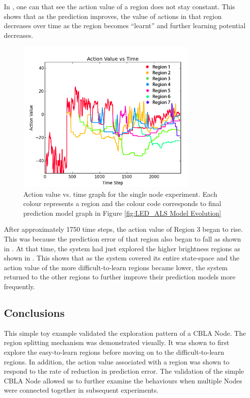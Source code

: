 In , one can that see the action value of a region does not stay constant. This shows that as the prediction improves, the value of actions in that region decreases over time as the region becomes ``learnt'' and further learning potential decreases. 

\begin{figure} [!htb]
	\centering
	\includegraphics[width=0.8\textwidth]{"fig/validations/LED_ALS Action Value vs Time"}
	\caption[Action value vs. time graph for the single node experiment]{Action value vs. time graph for the single node experiment. Each colour represents a region and the colour code corresponds to final prediction model graph in Figure \ref{fig:LED_ALS Model Evolution} }
	\label{fig:LED_ALS Action Value vs Time}
\end{figure}

After approximately 1750 time steps, the action value of Region 3 began to rise. This was because the prediction error of that region also began to fall as shown in . At that time, the system had just explored the higher brightness regions as shown in . This shows that as the system covered its entire state-space and the action value of the more difficult-to-learn regions became lower, the system returned to the other regions to further improve their prediction models more frequently.

\subsection{Conclusions}

This simple toy example validated the exploration pattern of a CBLA Node. The region splitting mechanism was demonstrated visually. It was shown to first explore the easy-to-learn regions before moving on to the difficult-to-learn regions. In addition, the action value associated with a region was shown to respond to the rate of reduction in prediction error. The validation of the simple CBLA Node allowed us to further examine the behaviours when multiple Nodes were connected together in subsequent experiments.


